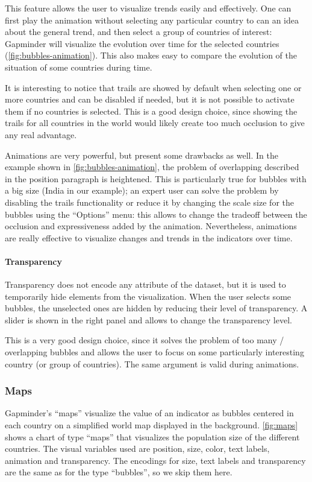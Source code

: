 This feature allows the user to visualize trends easily and effectively.
One can first play the animation without selecting any particular country to can an idea about the general trend, and then select a group of countries of interest:
Gapminder will visualize the evolution over time for the selected countries (\cref{fig:bubbles-animation}).
This also makes easy to compare the evolution of the situation of some countries during time.

It is interesting to notice that trails are showed by default when selecting one or more countries and can be disabled if needed, but it is not possible to activate them if no countries is selected.
This is a good design choice, since showing the trails for all countries in the world would likely create too much occlusion to give any real advantage.

Animations are very powerful, but present some drawbacks as well.
In the example shown in \cref{fig:bubbles-animation}, the problem of overlapping described in the position paragraph is heightened.
This is particularly true for bubbles with a big size (India in our example);
an expert user can solve the problem by disabling the trails functionality or reduce it by changing the scale size for the bubbles using the ``Options'' menu:
this allows to change the tradeoff between the occlusion and expressiveness added by the animation.
Nevertheless, animations are really effective to visualize changes and trends in the indicators over time.

\paragraph{Transparency}
Transparency does not encode any attribute of the dataset, but it is used to temporarily hide elements from the visualization.
When the user selects some bubbles, the unselected ones are hidden by reducing their level of transparency.
A slider is shown in the right panel and allows to change the transparency level.

This is a very good design choice, since it solves the problem of too many / overlapping bubbles and allows the user to focus on some particularly interesting country (or group of countries).
The same argument is valid during animations.


\subsubsection{Maps}
Gapminder's ``maps'' visualize the value of an indicator as bubbles centered in each country on a simplified world map displayed in the background.
\cref{fig:maps} shows a chart of type ``maps'' that visualizes the population size of the different countries.
The visual variables used are position, size, color, text labels, animation and transparency.
The encodings for size, text labels and transparency are the same as for the type ``bubbles'', so we skip them here.

